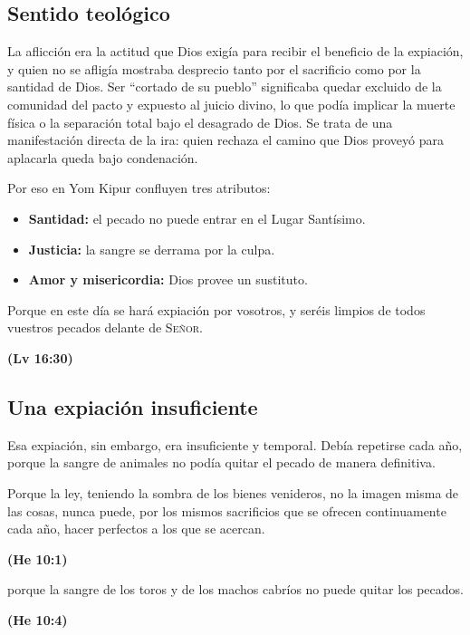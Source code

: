 \documentclass[11pt,letterpaper]{article}
\newcommand{\SENOR}{\textsc{Señor}}
\newcommand{\fuente}[1]{\par\hfill{\upshape\bfseries\small\textcolor{azul}{#1}}}
\begin{document}
\subsection{Sentido teológico}
La aflicción era la actitud que Dios exigía para recibir el beneficio de la expiación, y quien no se afligía mostraba desprecio tanto por el sacrificio como por la santidad de Dios. Ser ``cortado de su pueblo'' significaba quedar excluido de la comunidad del pacto y expuesto al juicio divino, lo que podía implicar la muerte física o la separación total bajo el desagrado de Dios. Se trata de una manifestación directa de la ira: quien rechaza el camino que Dios proveyó para aplacarla queda bajo condenación.

Por eso en Yom Kipur confluyen tres atributos:
\begin{itemize}
\item \textbf{Santidad:} el pecado no puede entrar en el Lugar Santísimo.
\item \textbf{Justicia:} la sangre se derrama por la culpa.
\item \textbf{Amor y misericordia:} Dios provee un sustituto.
\end{itemize}

\begin{cita}Porque en este día se hará expiación por vosotros, y seréis limpios de todos vuestros pecados delante de \SENOR.\fuente{(Lv 16:30)}\end{cita}

\subsection{Una expiación insuficiente}
Esa expiación, sin embargo, era insuficiente y temporal. Debía repetirse cada año, porque la sangre de animales no podía quitar el pecado de manera definitiva.

\begin{cita}Porque la ley, teniendo la sombra de los bienes venideros, no la imagen misma de las cosas, nunca puede, por los mismos sacrificios que se ofrecen continuamente cada año, hacer perfectos a los que se acercan.\fuente{(He 10:1)}\end{cita}

\begin{cita}porque la sangre de los toros y de los machos cabríos no puede quitar los pecados.\fuente{(He 10:4)}\end{cita}

\end{document}
